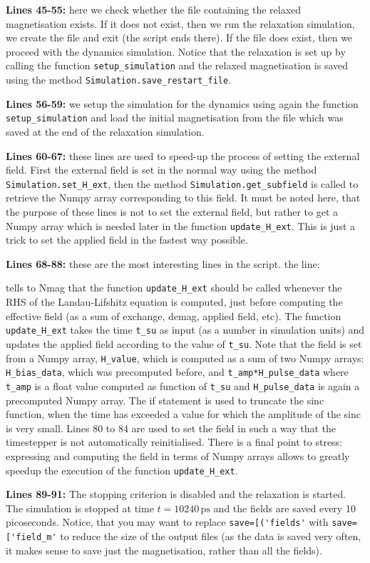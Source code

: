 \documentclass[11pt,oneside,openany]{article}
\begin{document}
\textbf{Lines 45-55:} here we check whether the file containing the relaxed
magnetisation exists. If it does not exist, then we run the relaxation
simulation, we create the file and exit (the script ends there). If the file
does exist, then we proceed with the dynamics simulation. Notice that the
relaxation is set up by calling the function \verb|setup_simulation| and the
relaxed magnetisation is saved using the method
\verb|Simulation.save_restart_file|.

\textbf{Lines 56-59:} we setup the simulation for the dynamics using again the
function \verb|setup_simulation| and load the initial magnetisation from the
file which was saved at the end of the relaxation simulation.

\textbf{Lines 60-67:} these lines are used to speed-up the process of setting
the external field. First the external field is set in the normal way using the
method \verb|Simulation.set_H_ext|, then the method
\verb|Simulation.get_subfield| is called to retrieve the Numpy array
corresponding to this field. It must be noted here, that the purpose of
these lines is not to set the external field, but rather to get a Numpy
array which is needed later in the function \verb|update_H_ext|. This is
just a trick to set the applied field in the fastest way possible.

\textbf{Lines 68-88:} these are the most interesting lines in the script.
the line:
%

%
tells to Nmag that the function \verb|update_H_ext| should be called whenever
the RHS of the Landau-Lifshitz equation is computed, just before computing the
effective field (as a sum of exchange, demag, applied field, etc). The function
\verb|update_H_ext| takes the time \verb|t_su| as input (as a number in
simulation units) and updates the applied field according to the value of
\verb|t_su|. Note that the field is set from a Numpy array, \verb|H_value|,
which is computed as a sum of two Numpy arrays: \verb|H_bias_data|, which was
precomputed before, and \verb|t_amp*H_pulse_data| where \verb|t_amp| is a float
value computed as function of \verb|t_su| and \verb|H_pulse_data| is again a
precomputed Numpy array.  The if statement is used to truncate the sinc
function, when the time has exceeded a value for which the amplitude of the
sinc is very small.  Lines 80 to 84 are used to set the field in such a way
that the timestepper is not automatically reinitialised.  There is a final
point to stress: expressing and computing the field in terms of Numpy arrays
allows to greatly speedup the execution of the function \verb|update_H_ext|.

\textbf{Lines 89-91:} The stopping criterion is disabled and the relaxation
is started. The simulation is stopped at time $t = 10240\,\mathrm{ps}$ and
the fields are saved every 10 picoseconds. Notice, that you may want to
replace \verb|save=[('fields'| with \verb|save=['field_m'| to reduce the
size of the output files (as the data is saved very often, it makes sense
to save just the magnetisation, rather than all the fields). 
\end{document}
